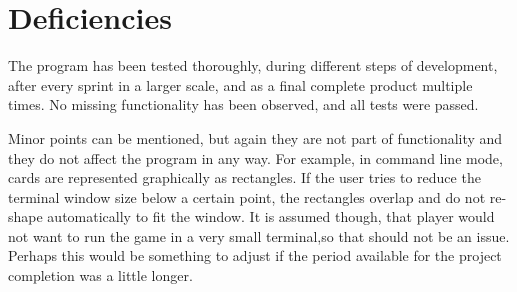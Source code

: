 \newpage
\section{Deficiencies}

The program has been tested thoroughly, during different steps of development, after every sprint in a larger scale, and as a final complete product multiple times. No missing functionality has been observed, and all tests were passed. 

Minor points can be mentioned, but again they are not part of functionality and they do not affect the program in any way. For example, in command line mode, cards are represented graphically as rectangles. If the user tries to reduce the terminal window size below a certain point, the rectangles overlap and do not re-shape automatically to fit the window. It is assumed though, that player would not want to run the game in a very small terminal,so that should not be an issue. Perhaps this would be something to adjust if the period available for the project completion was a little longer.

